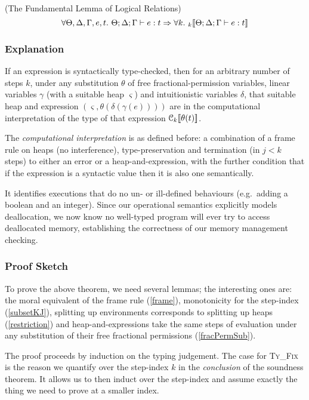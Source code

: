 \begin{theorem}
(The Fundamental Lemma of Logical Relations)
\[
    \forall \Theta, \Delta, \Gamma, e, t.\ \Theta; \Delta ; \Gamma \vdash e : t \Rightarrow
    \forall k.\ \mathcal{}_{k} [\![  \Theta; \Delta ; \Gamma \vdash e : t  ]\!]
\]
\end{theorem}

\subsubsection{Explanation}

If an expression is syntactically type-checked, then for an arbitrary number of
steps $k$, under any substitution $\theta$ of free fractional-permission
variables, linear variables $\gamma$ (with a suitable heap $\varsigma$) and
intuitionistic variables $\delta$, that suitable heap and expression
$(\varsigma, \theta(\delta(\gamma(e))))$ are in the computational
interpretation of the type of that expression $\mathcal{C}_{k} [\![  \theta(t)  ]\!]$.

The \emph{computational interpretation} is as defined before: a combination of
a frame rule on heaps (no interference), type-preservation and termination (in
$j < k$ steps) to either an error or a heap-and-expression, with the further
condition that if the expression is a syntactic value then it is also one
semantically.

It identifies executions that do no un- or ill-defined behaviours (e.g.\ adding
a boolean and an integer). Since our operational semantics explicitly models
deallocation, we now know no well-typed program will ever try to access
deallocated memory, establishing the correctness of our memory management
checking.

\subsubsection{Proof Sketch}

To prove the above theorem, we need several lemmas; the interesting ones are:
the moral equivalent of the frame rule (\ref{frame}), monotonicity for the
step-index (\ref{subsetKJ}), splitting up environments corresponds to splitting
up heaps (\ref{restriction}) and heap-and-expressions take the same steps of
evaluation under any substitution of their free fractional permissions
(\ref{fracPermSub}).

The proof proceeds by induction on the typing judgement.  The case for
\textsc{Ty\_Fix} is the reason we quantify over the step-index $k$ in the
\emph{conclusion} of the soundness theorem. It allows us to then induct over
the step-index and assume exactly the thing we need to prove at a smaller index.

